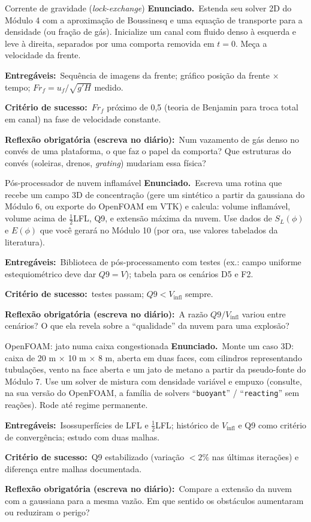 \documentclass[10pt,a4paper,twocolumn,openany]{report}
\newcommand{\enunciado}{\noindent\textbf{Enunciado.}\ }
\newcommand{\entregaveis}{\par\medskip\noindent\textbf{Entregáveis:}}
\newcommand{\criterio}{\par\medskip\noindent\textbf{Critério de sucesso:}\ }
\newcommand{\reflexao}{\par\medskip\noindent\textbf{Reflexão obrigatória (escreva no diário):}}
\begin{document}
\begin{tarefa}{Corrente de gravidade (\emph{lock-exchange})}
\enunciado Estenda seu solver 2D do Módulo 4 com a aproximação de Boussinesq
e uma equação de transporte para a densidade (ou fração de gás). Inicialize
um canal com fluido denso à esquerda e leve à direita, separados por uma
comporta removida em $t=0$. Meça a velocidade da frente.
\entregaveis\ Sequência de imagens da frente; gráfico posição da frente
$\times$ tempo; $Fr_f = u_f/\sqrt{g'H}$ medido.
\criterio $Fr_f$ próximo de 0,5 (teoria de Benjamin para troca total em
canal) na fase de velocidade constante.
\reflexao\ Num vazamento de gás denso no convés de uma plataforma, o que
faz o papel da comporta? Que estruturas do convés (soleiras, drenos,
\emph{grating}) mudariam essa física?
\end{tarefa}

\begin{tarefa}{Pós-processador de nuvem inflamável}
\enunciado Escreva uma rotina que recebe um campo 3D de concentração (gere
um sintético a partir da gaussiana do Módulo 6, ou exporte do OpenFOAM em
VTK) e calcula: volume inflamável, volume acima de $\frac12$LFL, Q9, e
extensão máxima da nuvem. Use dados de $S_L(\phi)$ e $E(\phi)$ que você
gerará no Módulo 10 (por ora, use valores tabelados da literatura).
\entregaveis\ Biblioteca de pós-processamento com testes (ex.: campo
uniforme estequiométrico deve dar $Q9=V$); tabela para os cenários D5 e F2.
\criterio testes passam; $Q9<V_{\text{infl}}$ sempre.
\reflexao\ A razão $Q9/V_{\text{infl}}$ variou entre cenários? O que ela
revela sobre a ``qualidade'' da nuvem para uma explosão?
\end{tarefa}

\begin{tarefa}{OpenFOAM: jato numa caixa congestionada}
\enunciado Monte um caso 3D: caixa de 20 m $\times$ 10 m $\times$ 8 m,
aberta em duas faces, com cilindros representando tubulações, vento na
face aberta e um jato de metano a partir da pseudo-fonte do Módulo 7. Use um
solver de mistura com densidade variável e empuxo (consulte, na sua versão
do OpenFOAM, a família de solvers ``\texttt{buoyant}'' / ``\texttt{reacting}''
sem reações). Rode até regime permanente.
\entregaveis\ Isossuperfícies de LFL e $\frac12$LFL; histórico de $V_{\text{infl}}$
e Q9 como critério de convergência; estudo com duas malhas.
\criterio Q9 estabilizado (variação $<2\%$ nas últimas iterações) e diferença
entre malhas documentada.
\reflexao\ Compare a extensão da nuvem com a gaussiana para a mesma vazão.
Em que sentido os obstáculos aumentaram ou reduziram o perigo?
\end{tarefa}
\end{document}
